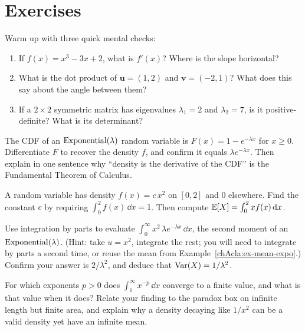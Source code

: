 \section{Exercises}
\label{chAcla:exercises}

\begin{exercise}
\label{chAcla:ex-warmup}
Warm up with three quick mental checks:
\begin{enumerate}
  \item If $f(x) = x^3 - 3x + 2$, what is $f'(x)$? Where is the slope horizontal?
  \item What is the dot product of $\mathbf{u} = (1, 2)$ and $\mathbf{v} = (-2, 1)$? What does this say about the angle between them?
  \item If a $2 \times 2$ symmetric matrix has eigenvalues $\lambda_1 = 2$ and $\lambda_2 = 7$, is it positive-definite? What is its determinant?
\end{enumerate}
\end{exercise}

\begin{exercise}
\label{chAcla:exr-density}
The CDF of an $\operatorname{Exponential}(\lambda)$ random variable is $F(x)=1-e^{-\lambda x}$ for $x\ge 0$. Differentiate
$F$ to recover the density $f$, and confirm it equals $\lambda e^{-\lambda x}$. Then explain in one
sentence why ``density is the derivative of the CDF'' is the Fundamental Theorem of Calculus.
\end{exercise}

\begin{exercise}
\label{chAcla:exr-normalize}
A random variable has density $f(x)=c\,x^2$ on $[0,2]$ and $0$ elsewhere. Find the constant $c$ by
requiring $\int_0^2 f(x)\,\dd x = 1$. Then compute $\operatorname{\mathbb{E}}[X]=\int_0^2 x f(x)\,\mathrm{d} x$.
\end{exercise}

\begin{exercise}
\label{chAcla:exr-parts}
Use integration by parts to evaluate $\int_0^\infty x^2\,\lambda e^{-\lambda x}\,\dd x$, the second
moment of an $\operatorname{Exponential}(\lambda)$. (Hint: take $u=x^2$, integrate the rest; you will need to integrate by
parts a second time, or reuse the mean from Example~\ref{chAcla:ex-mean-expo}.) Confirm your answer is
$2/\lambda^2$, and deduce that $\operatorname{Var}(X)=1/\lambda^2$.
\end{exercise}

\begin{exercise}
\label{chAcla:exr-tail}
For which exponents $p>0$ does $\int_1^\infty x^{-p}\,\dd x$ converge to a finite value, and what is
that value when it does? Relate your finding to the paradox box on infinite length but finite area,
and explain why a density decaying like $1/x^2$ can be a valid density yet have an infinite mean.
\end{exercise}

